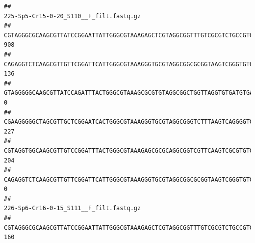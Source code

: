\documentclass[]{article}
\begin{document}
\begin{verbatim}
##                                                                                                                                                                                                                                                           225-Sp5-Cr15-0-20_S110__F_filt.fastq.gz
## CGTAGGGCGCAAGCGTTATCCGGAATTATTGGGCGTAAAGAGCTCGTAGGCGGTTTGTCGCGTCTGCCGTGAAAGTCCGGGGCTCAACTCCGGATCTGCGGTGGGTACGGGCAGACTAGAGTGATGTAGGGGAGACTGGAATTCCTGGTGTAGCGGTGAAATGCGCAGATATCAGGAGGAACACCGATGGCGAAGGCAGGTCTCTGGGCATTAACTGACGCTGAGGAGCGAAAGCATGGGGAGCGAACA                                     908
## CAGAGGTCTCAAGCGTTGTTCGGATTCATTGGGCGTAAAGGGTGCGTAGGCGGCGCGGTAAGTCGGGTGTGAAATCTCGGAGCTTAACTCCGAAACTGCATTCGATACTGCCGTGCTTGAGGACTGGAGAGGAGACTGGAATTTACGGTGTAGCGGTGAAATGCGTAGATATCGTAAGGAAGACCAGTGGCGAAGGCGGGTCTCTGGACAGTTCCTGACGCTGAGGCACGAAGGCCAGGGGAGCAAACG                                     136
## GTAGGGGGCAAGCGTTATCCAGATTTACTGGGCGTAAAGCGCGTGTAGGCGGCTGGTTAGGTGTGATGTGAAATCTTCCGGCTCAACCGGAAAACTGCATTGCAAACCGGCCTGGCTAGAGTGCAGGAGAGGGAAGCGGAATTCCAGGTGTAGCGGTGAAATGCGTAGATATCTGGAGGAACACCAGTGGCGAAGGCGGCTTCCTGGCCTGCAACTGACGCTGAGACGCGAAAGCGTGGGGAGCGAAC                                        0
## CGAAGGGGGCTAGCGTTGCTCGGAATCACTGGGCGTAAAGGGTGCGTAGGCGGGTCTTTAAGTCAGGGGTGAAATCCTGGAGCTCAACTCCAGAACTGCCTTTGATACTGAAGATCTTGAGTTCGGGAGAGGTGAGTGGAACTGCGAGTGTAGAGGTGAAATTCGTAGATATTCGCAAGAACACCAGTGGCGAAGGCGGCTCACTGGCCCGATACTGACGCTGAGGCACGAAAGCGTGGGGAGCAAACA                                     227
## CGTAGGTGGCAAGCGTTGTCCGGATTTACTGGGCGTAAAGAGCGCGCAGGCGGTCGTTCAAGTCGCGTGTGAAAGCCCCCGGCTCAACTGGGGAGGGTCACGCGATACTGATCGACTCGAAGGCAGGAGAGGGTAGTGGAATTCCCGGTGTAGTGGTGAAATGCGTAGATATCGGGAGGAACACCAGTGGCGAAGGCGACTACCTGGCCTGTTCTTGACGCTGAGGCGCGAAAGCTAGGGGAGCAAACG                                     204
## CAGAGGTCTCAAGCGTTGTTCGGATTCATTGGGCGTAAAGGGTGCGTAGGCGGCGCGGTAAGTCGGGTGTGAAATCTCGGGGCTTAACTCCGAAACTGCATTCGATACTGCCGTGCTTGAGGACTGGAGAGGAGACTGGAATTTACGGTGTAGCGGTGAAATGCGTAGATATCGTAAGGAAGACCAGTGGCGAAGGCGGGTCTCTGGACAGTTCCTGACGCTGAGGCACGAAGGCCAGGGGAGCAAACG                                       0
##                                                                                                                                                                                                                                                           226-Sp6-Cr16-0-15_S111__F_filt.fastq.gz
## CGTAGGGCGCAAGCGTTATCCGGAATTATTGGGCGTAAAGAGCTCGTAGGCGGTTTGTCGCGTCTGCCGTGAAAGTCCGGGGCTCAACTCCGGATCTGCGGTGGGTACGGGCAGACTAGAGTGATGTAGGGGAGACTGGAATTCCTGGTGTAGCGGTGAAATGCGCAGATATCAGGAGGAACACCGATGGCGAAGGCAGGTCTCTGGGCATTAACTGACGCTGAGGAGCGAAAGCATGGGGAGCGAACA                                     160

\end{verbatim}
\end{document}
